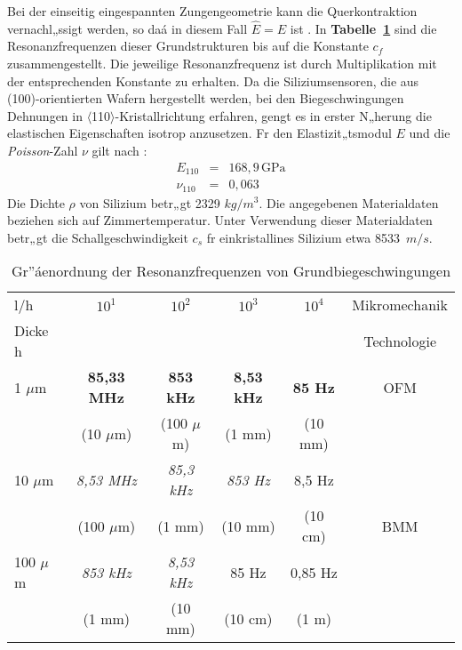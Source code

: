 Bei der einseitig eingespannten Zungengeometrie kann die Querkontraktion
vernachl„ssigt werden, so daá in diesem Fall $\hat E = E$ ist \cite{Ste91a}.
In {\bf Tabelle~\ref{tabresfreqanalyt}} sind die Resonanzfrequenzen
dieser Grundstrukturen
bis auf die Konstante $c_{f}$ zusammengestellt. Die jeweilige
Resonanzfrequenz ist durch Multiplikation mit der entsprechenden Konstante
zu erhalten. Da die Siliziumsensoren, die aus (100)-orientierten
Wafern hergestellt werden, bei den Biegeschwingungen Dehnungen in
$\langle$110$\rangle$-Kristallrichtung erfahren, gengt es in erster N„herung
die elastischen Eigenschaften isotrop anzusetzen. Fr den Elastizit„tsmodul
$E$ und die {\sl Poisson}-Zahl $\nu$ gilt nach \cite{Heu89}:
\begin{eqnarray}
\label{simat}
      E_{110}   & = & 168,9 \, \mbox{GPa}  \\
      \nu_{110} & = & 0,063 \nonumber
\end{eqnarray}
Die Dichte $\rho$ von Silizium betr„gt 2329 $kg/m^{3}$. Die
angegebenen Materialdaten beziehen sich auf Zimmertemperatur.
Unter Verwendung dieser Materialdaten betr„gt die Schallgeschwindigkeit
$c_{s}$ fr einkristallines Silizium etwa 8533~$m/s$.
\begin{table}[htb]
\caption{\label{tabresfreqanalyt}
 Gr”áenordnung der Resonanzfrequenzen von Grundbiegeschwingungen}
\begin{center}
\begin{tabular}{|l||c|c|c|c||c|}
\hline
 l/h & $10^{1}$ & $10^{2}$ & $10^{3}$ & $10^{4}$ & Mikromechanik \\
 Dicke h & & & & & Technologie \\
\hline \hline
 1 $\mu$m & {\bf 85,33 MHz} &  {\bf 853 kHz} & {\bf 8,53 kHz} & {\bf 85 Hz} & OFM \\
          & (10 $\mu$m)     & (100 $\mu$m)   & (1 mm)         & (10 mm) & \\
\hline \hline
 10 $\mu$m & {\em 8,53 MHz} & {\em 85,3 kHz} & {\em 853 Hz}   & 8,5 Hz &  \\
           & (100 $\mu$m)   & (1 mm)         & (10 mm)        & (10 cm) & BMM  \\
\cline{1-5}
 100 $\mu$m & {\em 853 kHz} & {\em 8,53 kHz} & 85 Hz          & 0,85 Hz & \\
            & (1 mm)        & (10 mm)        & (10 cm)        & (1 m) & \\
\hline
\end{tabular}
\end{center}
\end{table}
